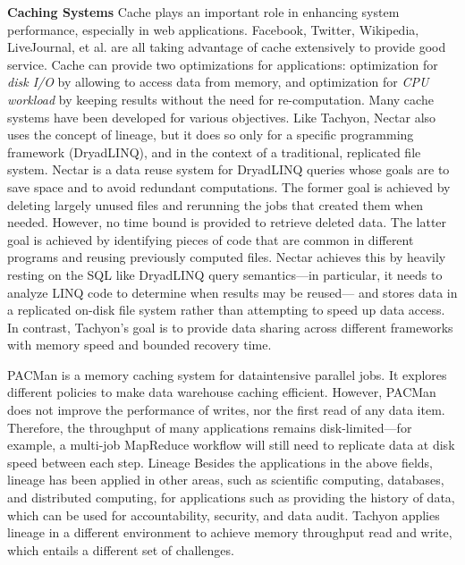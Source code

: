 \documentclass[twocolumn]{article}
\begin{document}
\noindent
\textbf{Caching Systems}
Cache plays an important role in enhancing system performance, especially in web applications. 
Facebook, Twitter, Wikipedia, LiveJournal, et al. are all taking advantage of cache extensively to provide good service. 
Cache can provide two optimizations for applications: optimization for \textit{disk I/O} by allowing to access data from
memory, and optimization for \textit{CPU workload} by keeping results without the need for re-computation. 
Many cache systems have been developed for various objectives.
Like Tachyon, Nectar also uses the concept of lineage, but it does so only for a specific programming framework (DryadLINQ), and in the context of a traditional, replicated file system. 
Nectar is a data reuse system for DryadLINQ queries whose goals are to save space and to avoid redundant computations. The former goal is achieved by deleting largely unused files and rerunning the jobs that created them when needed. However, no time bound is provided to retrieve deleted data. The latter goal is achieved by identifying pieces of code that are common in different programs and reusing previously computed files. Nectar achieves this by heavily resting on the SQL like DryadLINQ query semantics—in particular, it needs to analyze LINQ code to determine when results may be reused— and stores data in a replicated on-disk file system rather than attempting to speed up data access. In contrast, Tachyon’s goal is to provide data sharing across different frameworks with memory speed and bounded recovery time.

PACMan is a memory caching system for dataintensive parallel jobs. It explores different policies to make data warehouse caching efficient. However, PACMan does not improve the performance of writes, nor the first read of any data item. Therefore, the throughput of many applications remains disk-limited—for example, a multi-job MapReduce workflow will still need to replicate data at disk speed between each step.
Lineage Besides the applications in the above fields, lineage has been applied in other areas, such as scientific computing, databases, and distributed computing, for applications such as providing the history of data, which can be used for accountability, security, and data audit. Tachyon applies lineage in a different environment to achieve memory throughput read and write, which entails a different set of challenges.
\end{document}
